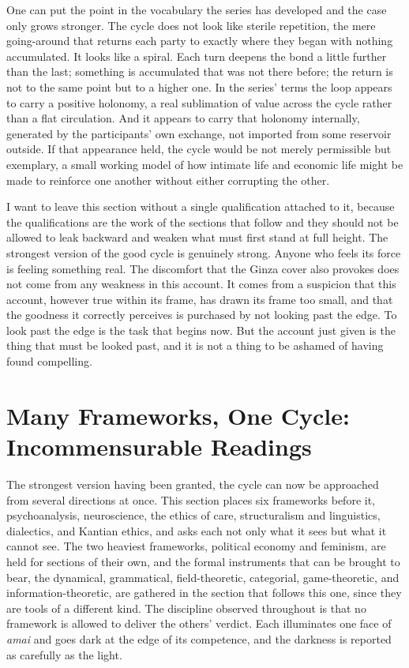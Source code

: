 \documentclass[11pt,a4paper]{article}
\begin{document}
One can put the point in the vocabulary the series has developed and the case only grows stronger. The cycle does not look like sterile repetition, the mere going-around that returns each party to exactly where they began with nothing accumulated. It looks like a spiral. Each turn deepens the bond a little further than the last; something is accumulated that was not there before; the return is not to the same point but to a higher one. In the series' terms the loop appears to carry a positive holonomy, a real sublimation of value across the cycle rather than a flat circulation. And it appears to carry that holonomy internally, generated by the participants' own exchange, not imported from some reservoir outside. If that appearance held, the cycle would be not merely permissible but exemplary, a small working model of how intimate life and economic life might be made to reinforce one another without either corrupting the other.

I want to leave this section without a single qualification attached to it, because the qualifications are the work of the sections that follow and they should not be allowed to leak backward and weaken what must first stand at full height. The strongest version of the good cycle is genuinely strong. Anyone who feels its force is feeling something real. The discomfort that the Ginza cover also provokes does not come from any weakness in this account. It comes from a suspicion that this account, however true within its frame, has drawn its frame too small, and that the goodness it correctly perceives is purchased by not looking past the edge. To look past the edge is the task that begins now. But the account just given is the thing that must be looked past, and it is not a thing to be ashamed of having found compelling.

\section{Many Frameworks, One Cycle: Incommensurable Readings}

The strongest version having been granted, the cycle can now be approached from several directions at once. This section places six frameworks before it, psychoanalysis, neuroscience, the ethics of care, structuralism and linguistics, dialectics, and Kantian ethics, and asks each not only what it sees but what it cannot see. The two heaviest frameworks, political economy and feminism, are held for sections of their own, and the formal instruments that can be brought to bear, the dynamical, grammatical, field-theoretic, categorial, game-theoretic, and information-theoretic, are gathered in the section that follows this one, since they are tools of a different kind. The discipline observed throughout is that no framework is allowed to deliver the others' verdict. Each illuminates one face of \textit{amai} and goes dark at the edge of its competence, and the darkness is reported as carefully as the light.
\end{document}
